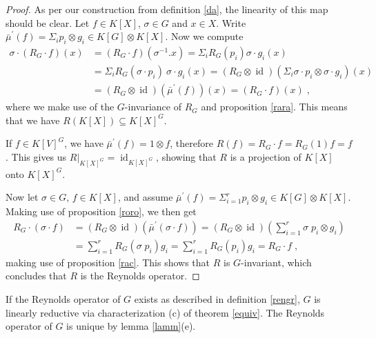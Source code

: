 \begin{proof}
  As per our construction from definition \ref{da}, the linearity of this map should be clear.
  Let $f \in K[X]$, $\sigma \in G$ and $x \in X$.
  Write $\bar{\mu}^\prime (f) = \Sigma_i p_i \otimes g_i \in K[G] \otimes K[X] $.
  Now we compute
  \begin{equation*}
    \begin{aligned}
      \sigma\cdot  \left( R_G \cdot f \right) (x)
      &= \left( R_G \cdot f \right) (\sigma^{-1}.x)
      = \Sigma_i R_G \left( p_i \right)  \sigma\cdot g_i \left(  x \right) \\
      &= \Sigma_i R_G (\sigma\cdot p_i) \: \sigma\cdot g_i (x)
      = \left( R_G \otimes \operatorname{id} \right) \left( \Sigma_i \sigma\cdot p_i \otimes \sigma\cdot g_i \right) (x)\\
      &= (R_G \otimes \operatorname{id}) (\bar{\mu}^\prime (f)) (x)
      = (R_G \cdot f) (x) \; ,
    \end{aligned}
  \end{equation*}
  where we make use of the $G$-invariance of $R_G$ and proposition \ref{rara}.
  This means that we have $R(K[X]) \subseteq K[X]^G$.
  
  If $f \in K[V]^G$, we have $\bar{\mu}^\prime (f) = 1 \otimes f$, therefore $R(f) = R_G \cdot f = R_G (1)f = f$.
  This gives us $\left. R \right|_{K[X]^G} = \operatorname{id}_{K[X]^G}$, showing that $R$ is a projection of $K[X]$ onto $K[X]^G$.
  
  Now let $\sigma \in G$, $ f \in K[X]$, and assume $\bar{\mu}^\prime(f) = \Sigma_{i=1}^r p_i \otimes g_i \in K[G] \otimes K[X]$.
  Making use of proposition \ref{roro}, we then get
  \begin{equation*}
    \begin{aligned}
      R_G \cdot ( \sigma\cdot f)
      &= (R_G \otimes \operatorname{id}) \left(\bar{\mu}^\prime(\sigma\cdot f)\right)
      = (R_G \otimes \operatorname{id}) \left(\sum_{i=1}^r \sigma \dot{\phantom{.}}p_i \otimes g_i \right) \\
      &= \sum_{i=1}^r R_G(\sigma\dot{\phantom{.}}p_i)g_i
      = \sum_{i=1}^r R_G(p_i)g_i 
      = R_G \cdot f \; ,
    \end{aligned}
  \end{equation*}
  making use of proposition \ref{rac}.
This shows that $R$ is $G$-invariant, which concludes that $R$ is the Reynolds operator.
\end{proof}

\begin{corollary}
  If the Reynolds operator of $G$ exists as described in definition \ref{rengr}, $G$ is linearly reductive via characterization (c) of theorem \ref{equiv}.
  The Reynolds operator of $G$ is unique by lemma \ref{lamm}(e).
\end{corollary}

